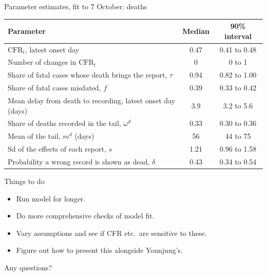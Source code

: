 \documentclass[aspectratio=169,9pt]{beamer}
\newcommand{\cfr}{\mathrm{CFR}}
\begin{document}
\begin{frame}{Parameter estimates, fit to 7 October: deaths}
\begin{center}
\renewcommand{\arraystretch}{1.25}
\begin{tabular}{lcc}
\toprule
Parameter & Median & 90\% interval \\
\midrule
$\cfr_t$, latest onset day & 0.47 & 0.41 to 0.48 \\
Number of changes in $\cfr_t$ & 0 & 0 to 1 \\
Share of fatal cases whose death brings the report, $\tau$ & 0.94 & 0.82 to 1.00 \\
Share of fatal cases misdated, $f$ & 0.39 & 0.33 to 0.42 \\
Mean delay from death to recording, latest onset day (days) & 3.9 & 3.2 to 5.6 \\
Share of deaths recorded in the tail, $\omega^{d}$ & 0.33 & 0.30 to 0.36 \\
Mean of the tail, $m^{d}$ (days) & 56 & 44 to 75 \\
Sd of the effects of each report, $s$ & 1.21 & 0.96 to 1.58 \\
Probability a wrong record is shown as dead, $\delta$ & 0.43 & 0.34 to 0.54 \\
\bottomrule
\end{tabular}
\end{center}
\end{frame}

\begin{frame}{Things to do}
\begin{itemize}
\setlength{\itemsep}{1.2em}
\item Run model for longer.
\item Do more comprehensive checks of model fit.
\item Vary assumptions and see if CFR etc.\ are sensitive to these.
\item Figure out how to present this alongside Younjung's.
\end{itemize}
\end{frame}

\begin{frame}
\centering
\Huge Any questions?
\end{frame}

\appendix
\end{document}
